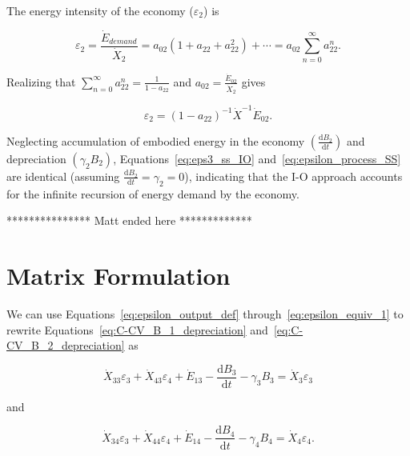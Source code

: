The energy intensity of the economy ($\varepsilon_{2}$) is 

\begin{equation} \label{eq:epsilon_process_SS_intermediate}
	\varepsilon_{2} 
	= \frac{\dot{E}_{demand}}{\dot{X}_{2}} 
	= a_{02}(1 + a_{22} + a_{22}^2) + \cdots 
	= a_{02}\sum_{n=0}^{\infty}a_{22}^{n}.
\end{equation}

Realizing that $\sum_{n=0}^{\infty}a_{22}^{n} 
= \frac{1}{1-a_{22}}$ and $a_{02} 
= \frac{\dot{E}_{02}}{\dot{X}_{2}}$ gives

\begin{equation} \label{eq:epsilon_process_SS}
	\varepsilon_{2} = {(1-a_{22})}^{-1} \dot{X}^{-1} \dot{E}_{02}.
\end{equation}

Neglecting accumulation of embodied energy in the economy
$\left(\frac{\mathrm{d}B_{2}}{\mathrm{d}t}\right)$ 
and depreciation $\left(\gamma_{2}B_{2}\right)$, 
Equations~\ref{eq:eps3_ss_IO} and~\ref{eq:epsilon_process_SS} are identical 
(assuming $\frac{\mathrm{d}B_{2}}{\mathrm{d}t} =\gamma_{2} = 0$), 
indicating that the I-O approach accounts 
for the infinite recursion of energy demand by the economy.


*************** Matt ended here *************

\section{Matrix Formulation}

We can use Equations~\ref{eq:epsilon_output_def} 
through~\ref{eq:epsilon_equiv_1} to rewrite 
Equations~\ref{eq:C-CV_B_1_depreciation} 
and~\ref{eq:C-CV_B_2_depreciation} as

\begin{equation} \label{eq:CV_B_3_with_eps}
	\dot{X}_{33}\varepsilon_{3} + \dot{X}_{43}\varepsilon_{4} + \dot{E}_{13} - \frac{\mathrm{d}B_{3}}{\mathrm{d}t} - \gamma_{3}B_{3} = \dot{X}_{3}\varepsilon_{3}
\end{equation}

\noindent and 

\begin{equation} \label{eq:CV_B_4_with_eps}
	\dot{X}_{34}\varepsilon_{3} + \dot{X}_{44}\varepsilon_{4} + \dot{E}_{14} - \frac{\mathrm{d}B_{4}}{\mathrm{d}t} - \gamma_{4}B_{4} = \dot{X}_{4}\varepsilon_{4}.
\end{equation}

